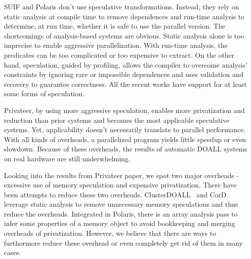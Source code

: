 SUIF and Polaris don't use speculative transformations. Instead, they rely
on static analysis at compile time to remove dependences and run-time
analysis to determine, at run time, whether it is safe to use the parallel
version.
%
The shortcomings of analysis-based systems are obvious. Static analysis
alone is too imprecise to enable aggressive parallelization. With run-time
analysis, the predicates can be too complicated or too expensive to
extract.
%
On the other hand, speculation, guided by profiling, allows the compiler to
overcome analysis' constraints by ignoring rare or impossible dependences
and uses validation and recovery to guarantee correctness. All the recent
works have support for at least some forms of speculation.

Privateer, by using more aggressive speculation, enables more privatization
and reduction than prior systems and becomes the most applicable
speculative systems. Yet, applicability doesn't necessarily translate to
parallel performance. With all kinds of overheads, a parallelized program
yields little speedup or even slowdown. Because of these overheads, the
results of automatic DOALL systems on real hardware are still
underwhelming.

Looking into the results from Privateer paper, we spot two major overheads
- excessive use of memory speculation and expensive privatization.
%
There have been attempts to reduce these two overheads.
ClusterDOALL~\cite{kim:12:cgo} and CorD~\cite{ctian:2008:micro} leverage
static analysis to remove unnecessary memory speculations and thus reduce
the overheads. Integrated in Polaris, there is an array analysis pass
\cite{tu:94:lcpc} to infer some properties of a memory object to avoid
bookkeeping and merging overheads of privatization. However, we believe
that there are ways to furthormore reduce these overhead or even completely
get rid of them in many cases.


